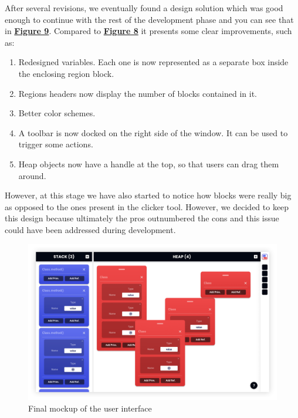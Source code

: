 \documentclass[]{usiinfbachelorproject}
\begin{document}
\noindent After several revisions, we eventually found a design solution which was good enough to continue with the rest of the development phase and you can see that in \hyperref[final ui]{\textbf{Figure 9}}. Compared to \hyperref[separate regions]{\textbf{Figure 8}} it presents some clear improvements, such as:

\begin{enumerate}
	\item Redesigned variables. Each one is now represented as a separate box inside the enclosing region block.
	\item Regions headers now display the number of blocks contained in it.
	\item Better color schemes.
	\item A toolbar is now docked on the right side of the window. It can be used to trigger some actions.
	\item Heap objects now have a handle at the top, so that users can drag them around.
\end{enumerate}

\noindent However, at this stage we have also started to notice how blocks were really big as opposed to the ones present in the clicker tool. However, we decided to keep this design because ultimately the pros outnumbered the cons and this issue could have been addressed during development.

\vspace{\fill}

\pagebreak

\begin{figure}[h!]
\centering
\includegraphics[width=\textwidth]{figures/final_mockup.png}
\caption {Final mockup of the user interface}
\label{final ui}
\end{figure}
\end{document}
